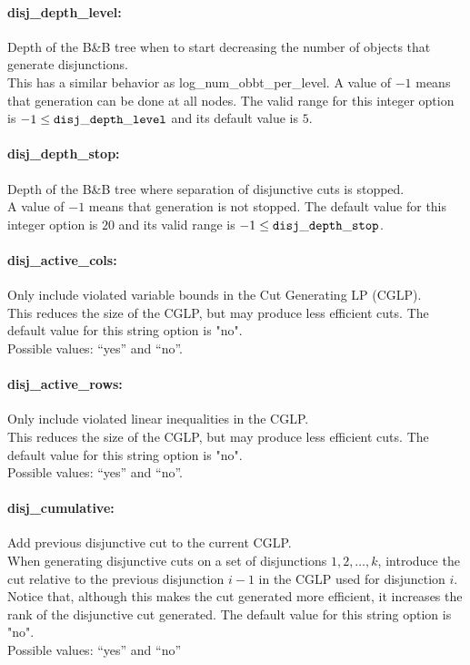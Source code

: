 \paragraph{disj\_depth\_level:}\label{sec:disj_depth_level} Depth of the B\&B tree when to start decreasing the number of objects that generate disjunctions. $\;$ \\
This has a similar behavior as log\_num\_obbt\_per\_level.
A value of $-1$ means that generation can be done at all nodes.
The valid range for this integer option is $-1 \le {\tt disj\_depth\_level }$ and its default value is $5$.

\paragraph{disj\_depth\_stop:}\label{sec:disj_depth_stop} Depth of the B\&B tree where separation of disjunctive cuts is stopped. $\;$ \\
A value of $-1$ means that generation is not stopped.
The default value for this integer option is $20$ and its valid range is $-1 \le {\tt disj\_depth\_stop}$.

\paragraph{disj\_active\_cols:}\label{sec:disj_active_cols} Only include violated variable bounds in the Cut Generating LP (CGLP). $\;$ \\
This reduces the size of the CGLP, but may produce less efficient cuts.
The default value for this string option is "no". \\ 
Possible values: ``yes'' and ``no''.

\paragraph{disj\_active\_rows:}\label{sec:disj_active_rows} Only include violated linear inequalities in the CGLP. $\;$ \\
This reduces the size of the CGLP, but may produce less efficient cuts.
The default value for this string option is "no". \\ 
Possible values: ``yes'' and ``no''.

\paragraph{disj\_cumulative:}\label{sec:disj_cumulative} Add previous disjunctive cut to the current CGLP. $\;$ \\
When generating disjunctive cuts on a set of disjunctions $1, 2, \ldots, k$, introduce the cut relative to the previous disjunction $i-1$ in the CGLP used for disjunction $i$. Notice that, although this makes
the cut generated more efficient, it increases the rank of the disjunctive cut generated.
The default value for this string option is "no".\\
Possible values: ``yes'' and ``no''

